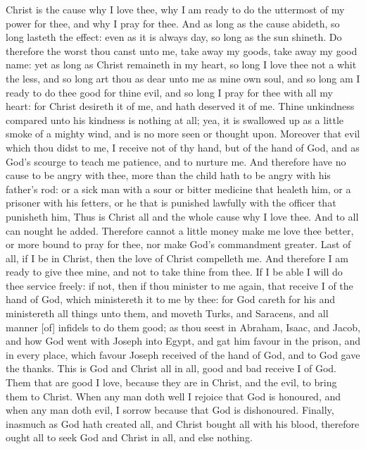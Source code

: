 Christ is the cause why I love thee, why I am ready to 
do the uttermost of my power for thee, and why I pray for 
thee. And as long as the cause abideth, so long lasteth 
the effect: even as it is always day, so long as the sun 
shineth. Do therefore the worst thou canst unto me, take 
away my goods, take away my good name: yet as long 
as Christ remaineth in my heart, so long I love thee not a 
whit the less, and so long art thou as dear unto me as 
mine own soul, and so long am I ready to do thee good 
for thine evil, and so long I pray for thee with all my 
heart: for Christ desireth it of me, and hath deserved it 
of me. Thine unkindness compared unto his kindness is 
nothing at all; yea, it is swallowed up as a little smoke of a 
mighty wind, and is no more seen or thought upon. 
Moreover that evil which thou didst to me, I receive not 
of thy hand, but of the hand of God, and as God's 
scourge to teach me patience, and to nurture me. And 
therefore have no cause to be angry with thee, more than 
the child hath to be angry with his father's rod: or a sick 
man with a sour or bitter medicine that healeth him, or a 
prisoner with his fetters, or he that is punished lawfully 
with the officer that punisheth him, Thus is Christ all 
and the whole cause why I love thee. And to all can 
nought he added. Therefore cannot a little money make 
me love thee better, or more bound to pray for thee, nor 
make God's commandment greater. Last of all, if I be 
in Christ, then the love of Christ compelleth me. And 
therefore I am ready to give thee mine, and not to take 
thine from thee. If I be able I will do thee service freely: 
if not, then if thou minister to me again, that receive I of 
the hand of God, which ministereth it to me by thee: for 
God careth for his and ministereth all things unto them, 
and moveth Turks, and Saracens, and all manner [of] infidels
to do them good; as thou seest in Abraham, Isaac, 
and Jacob, and how God went with Joseph into Egypt, 
and gat him favour in the prison, and in every place, which 
favour Joseph received of the hand of God, and to God 
gave the thanks. This is God and Christ all in all, good 
and bad receive I of God. Them that are good I love, 
because they are in Christ, and the evil, to bring them to 
Christ. When any man doth well I rejoice that God is 
honoured, and when any man doth evil, I sorrow because 
that God is dishonoured. Finally, inasmuch as God 
hath created all, and Christ bought all with his blood, 
therefore ought all to seek God and Christ in all, and else 
nothing. 

